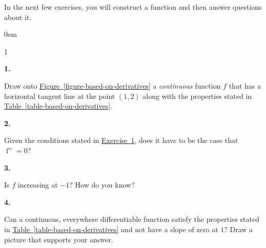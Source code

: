 \documentclass[12pt,]{book}
\theoremstyle{plain}
\theoremstyle{definition}
\numberwithin{equation}{section}
\newcommand{\hrulemedium}{\noalign{\hrule height 0.07em}}
\newcommand{\hrulethick} {\noalign{\hrule height 0.11em}}
\newcounter{figstack}
\newcounter{figindex}
\newlength\fight
\newcommand\pushValignCaptionBottom[5][b]{%
\stepcounter{figstack}%
\expandafter\def\csname %
figalign\romannumeral\value{figstack}\endcsname{#1}%
\expandafter\def\csname %
figtype\romannumeral\value{figstack}\endcsname{#2}%
\expandafter\def\csname %
figwd\romannumeral\value{figstack}\endcsname{#3}%
\expandafter\def\csname %
figcontent\romannumeral\value{figstack}\endcsname{#4}%
\expandafter\def\csname %
figcap\romannumeral\value{figstack}\endcsname{#5}%
\setbox0=\hbox{%
\begin{#2}{#3}#4\end{#2}}%
\ifdim\dimexpr\ht0+\dp0\relax>\fight\global\setlength{\fight}{%
\dimexpr\ht0+\dp0\relax}\fi%
}
\newcommand\popValignCaptionBottom{%
\setcounter{figindex}{0}%
\hfill%
\whiledo{\value{figindex}<\value{figstack}}{%
\stepcounter{figindex}%
\def\tmp{\csname figwd\romannumeral\value{figindex}\endcsname}%
\begin{\csname figtype\romannumeral\value{figindex}\endcsname}[t]{\tmp}%
\centering%
\stackinset{c}{}%
{\csname figalign\romannumeral\value{figindex}\endcsname}{}%
{\csname figcontent\romannumeral\value{figindex}\endcsname}%
{\rule{0pt}{\fight}}\par%
\csname figcap\romannumeral\value{figindex}\endcsname%
\end{\csname figtype\romannumeral\value{figindex}\endcsname}%
\hfill%
}%
\setcounter{figstack}{0}%
\setlength{\fight}{0pt}%
\hfill%
}
\newenvironment{exercisegroup}%
{\medskip\noindent}%
{\par\bigskip}%
\newlength{\exercisegroupindent}%
\newlength{\exercisegroupitemwidth}%
\newenvironment{exercisegrouplist}%
{\vspace{-\partopsep}%
\begin{adjustwidth}{\exercisegroupindent}{0em}}%
{\end{adjustwidth}%
\vspace{-\partopsep}%
\vspace{\baselineskip}}%
\newenvironment{exercisegroupbycol}[1]%
{\begin{exercisegrouplist}%
\vspace{-\multicolsep}%
\begin{multicols}{#1}%
\setlength{\parindent}{0em}%
\setlength{\exercisegroupitemwidth}{\linewidth}}%
{\end{multicols}%
\vspace{-\multicolsep}%
\end{exercisegrouplist}}%
\newenvironment{exercisegroupitem}[1]%
{\begin{minipage}[t]{\exercisegroupitemwidth}
\vspace{0pt}%
{\bfseries#1}%
\rule{0pt}{\baselineskip}}{\strut%
\end{minipage}%
\hspace{\columnsep}}%
\providecommand\phantomsection{}
\newcommand{\fe}[2]{\mathop{{#1}{\left(#2\right)}}}
\newcommand{\ointerval}[2]{\left(#1,#2\right)}
\newcommand{\point}[2]{\left(#1,#2\right)}
\newcommand{\fd}[1]{#1'}
\newcommand{\sd}[1]{#1''}
\begin{document}
\begin{exercisegroup}%
In the next few exercises, you will construct a function and then answer questions about it.%
\par
\begin{exercisegroupbycol}{1}%
\begin{exercisegroupitem}{1. }\phantomsection\hypertarget{exercise-based-on-derivatives}{\null}
Draw onto \hyperref[figure-based-on-derivatives]{Figure~\ref*{figure-based-on-derivatives}} a \emph{continuous} function \(f\) that has a horizontal tangent line at the point \(\point{1}{2}\) along with the properties stated in \hyperref[table-based-on-derivatives]{Table~\ref*{table-based-on-derivatives}}.%
\end{exercisegroupitem}%
\par%
\begin{exercisegroupitem}{2. }\phantomsection\hypertarget{exercise-260}{\null}
Given the conditions stated in \hyperref[exercise-based-on-derivatives]{Exercise~1}, does it have to be the case that \(\fe{\sd{f}}{-1}=0\)?%
\end{exercisegroupitem}%
\par%
\begin{exercisegroupitem}{3. }\phantomsection\hypertarget{exercise-261}{\null}
Is \(f\) increasing at \(-1\)?  How do you know?%
\end{exercisegroupitem}%
\par%
\begin{exercisegroupitem}{4. }\phantomsection\hypertarget{exercise-262}{\null}
Can a continuous, everywhere differentiable function satisfy the properties stated in \hyperref[table-based-on-derivatives]{Table~\ref*{table-based-on-derivatives}} and not have a slope of zero at \(1\)?  Draw a picture that supports your answer.%
\end{exercisegroupitem}%
\par%
\end{exercisegroupbycol}%
\end{exercisegroup}%
\end{document}

